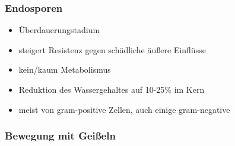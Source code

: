 \subsubsection{Endosporen}

\begin{itemize}
	\item Überdauerungstadium
	\item steigert Resistenz gegen schädliche äußere Einflüsse
	\item kein/kaum Metabolismus
	\item Reduktion des Wassergehaltes auf 10-25\% im Kern
	\item meist von gram-positive Zellen, auch einige gram-negative
\end{itemize}

\subsubsection{Bewegung mit Geißeln}

